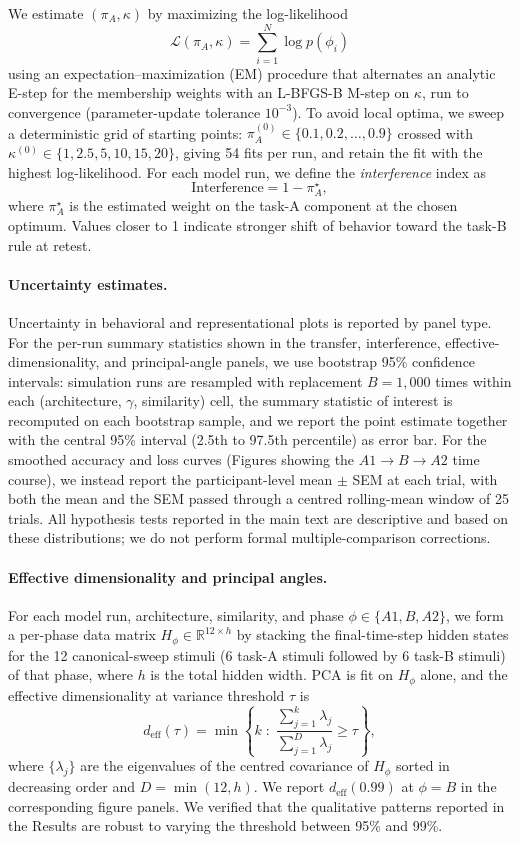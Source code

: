 We estimate $(\pi_A, \kappa)$ by maximizing the log-likelihood
\[
\mathcal{L}(\pi_A, \kappa) = \sum_{i=1}^N \log p(\phi_i)
\]
using an expectation--maximization (EM) procedure that alternates an analytic E-step for the membership weights with an L-BFGS-B M-step on $\kappa$, run to convergence (parameter-update tolerance $10^{-3}$). To avoid local optima, we sweep a deterministic grid of starting points: $\pi_A^{(0)} \in \{0.1, 0.2, \ldots, 0.9\}$ crossed with $\kappa^{(0)} \in \{1, 2.5, 5, 10, 15, 20\}$, giving 54 fits per run, and retain the fit with the highest log-likelihood. For each model run, we define the \emph{interference} index as
\[
\mathrm{Interference} = 1 - \pi_A^\star,
\]
where $\pi_A^\star$ is the estimated weight on the task-A component at the chosen optimum. Values closer to 1 indicate stronger shift of behavior toward the task-B rule at retest.

\paragraph{Uncertainty estimates.}
Uncertainty in behavioral and representational plots is reported by panel type. For the per-run summary statistics shown in the transfer, interference, effective-dimensionality, and principal-angle panels, we use bootstrap 95\% confidence intervals: simulation runs are resampled with replacement $B = 1{,}000$ times within each (architecture, $\gamma$, similarity) cell, the summary statistic of interest is recomputed on each bootstrap sample, and we report the point estimate together with the central 95\% interval (2.5th to 97.5th percentile) as error bar. For the smoothed accuracy and loss curves (Figures showing the $A1 \rightarrow B \rightarrow A2$ time course), we instead report the participant-level mean $\pm$ SEM at each trial, with both the mean and the SEM passed through a centred rolling-mean window of 25 trials. All hypothesis tests reported in the main text are descriptive and based on these distributions; we do not perform formal multiple-comparison corrections.

\paragraph{Effective dimensionality and principal angles.}
For each model run, architecture, similarity, and phase $\phi \in \{A1, B, A2\}$, we form a per-phase data matrix $H_\phi \in \mathbb{R}^{12 \times h}$ by stacking the final-time-step hidden states for the 12 canonical-sweep stimuli (6 task-A stimuli followed by 6 task-B stimuli) of that phase, where $h$ is the total hidden width. PCA is fit on $H_\phi$ alone, and the effective dimensionality at variance threshold $\tau$ is
\[
d_{\mathrm{eff}}(\tau) = \min\!\left\{ k \;:\; \frac{\sum_{j=1}^k \lambda_j}{\sum_{j=1}^{D} \lambda_j} \geq \tau \right\},
\]
where $\{\lambda_j\}$ are the eigenvalues of the centred covariance of $H_\phi$ sorted in decreasing order and $D = \min(12, h)$. We report $d_{\mathrm{eff}}(0.99)$ at $\phi = B$ in the corresponding figure panels. We verified that the qualitative patterns reported in the Results are robust to varying the threshold between 95\% and 99\%.

